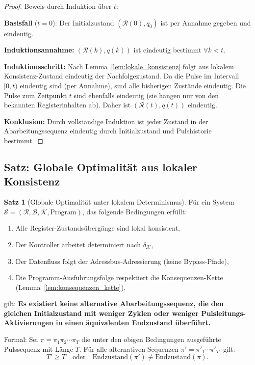 \documentclass[a4paper,12pt]{article}
\theoremstyle{definition}
\newtheorem{satz}{Satz}
\begin{document}
\begin{proof}
	Beweis durch Induktion über $t$:
	
	\textbf{Basisfall} ($t = 0$): Der Initialzustand $(\mathcal{R}(0), q_0)$ ist per Annahme gegeben und eindeutig.
	
	\textbf{Induktionsannahme:} $(\mathcal{R}(k), q(k))$ ist eindeutig bestimmt $\forall k < t$.
	
	\textbf{Induktionsschritt:} Nach Lemma~\ref{lem:lokale_konsistenz} folgt aus lokalem Konsistenz-Zustand eindeutig der Nachfolgezustand. Da die Pulse im Intervall $[0, t)$ eindeutig sind (per Annahme), sind alle bisherigen Zustände eindeutig. Die Pulse zum Zeitpunkt $t$ sind ebenfalls eindeutig (sie hängen nur von den bekannten Registerinhalten ab). Daher ist $(\mathcal{R}(t), q(t))$ eindeutig.
	
	\textbf{Konklusion:} Durch vollständige Induktion ist jeder Zustand in der Abarbeitungssequenz eindeutig durch Initialzustand und Pulshistorie bestimmt.
\end{proof}

\subsection{Satz: Globale Optimalität aus lokaler Konsistenz}

\begin{satz}[Globale Optimalität unter lokalem Determinismus]
	\label{satz:global_optimal}
	Für ein System $\mathcal{S} = (\mathcal{R}, \mathcal{B}, \mathcal{K}, \text{Program})$, das folgende Bedingungen erfüllt:
	\begin{enumerate}
		\item Alle Register-Zustandsübergänge sind lokal konsistent,
		\item Der Kontroller arbeitet determiniert nach $\delta_{\mathcal{K}}$,
		\item Der Datenfluss folgt der Adressbus-Adressierung (keine Bypass-Pfade),
		\item Die Programm-Ausführungsfolge respektiert die Konsequenzen-Kette (Lemma~\ref{lem:konsequenzen_kette}),
	\end{enumerate}
	gilt: \textbf{Es existiert keine alternative Abarbeitungssequenz, die den gleichen Initialzustand mit weniger Zyklen oder weniger Pulsleitungs-Aktivierungen in einen äquivalenten Endzustand überführt.}
	
	Formal: Sei $\pi = \pi_1 \pi_2 \cdots \pi_T$ die unter den obigen Bedingungen ausgeführte Pulssequenz mit Länge $T$. Für alle alternativen Sequenzen $\pi' = \pi'_1 \cdots \pi'_{T'}$ gilt:
	\[
	T' \geq T \quad \text{oder} \quad \text{Endzustand}(\pi') \not\equiv \text{Endzustand}(\pi).
	\]
\end{satz}
\end{document}
